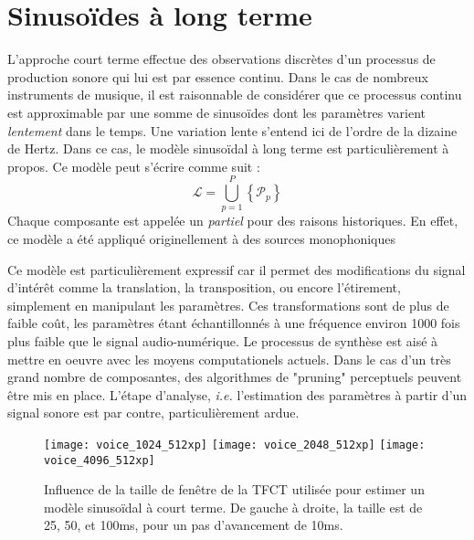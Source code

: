
\section{ \nmu Sinusoïdes à long terme}  \label{sec:slt}

L'approche court terme effectue des observations discrètes d'un processus de production sonore qui lui est par essence continu. Dans le cas de nombreux instruments de musique, il est raisonnable de considérer que ce processus continu est approximable par une somme de sinusoïdes dont les paramètres varient \textsl{lentement} dans le temps. Une variation lente s'entend ici de l'ordre de la dizaine de Hertz. Dans ce cas, le modèle sinusoïdal à long terme est particulièrement à propos. Ce modèle peut s'écrire comme suit :
\begin{equation}
\mathcal{L}=\bigcup_{p=1}^{P}\left\{\mathcal{P}_{p}\right\}
\end{equation}
Chaque composante est appelée un \textsl{partiel} pour des raisons historiques. En effet, ce modèle a été appliqué originellement à des sources monophoniques

Ce modèle est particulièrement expressif car il permet des modifications du signal d'intérêt comme la translation, la transposition, ou encore l'étirement, simplement en manipulant les paramètres. Ces transformations sont de plus de faible coût, les paramètres étant échantillonnés à une fréquence environ 1000 fois plus faible que le signal audio-numérique. Le processus de synthèse est aisé à mettre en oeuvre avec les moyens computationels actuels. Dans le cas d'un très grand nombre de composantes, des algorithmes de "pruning" perceptuels peuvent être mis en place\cite{lagrangeDafx01}.
L'étape d'analyse, \textit{i.e.} l'estimation des paramètres à partir d'un signal sonore est par contre, particulièrement ardue.

\begin{figure*}
  \texttt{[image: voice\_1024\_512xp]}
  \texttt{[image: voice\_2048\_512xp]}
  \texttt{[image: voice\_4096\_512xp]}
  \caption{Influence de la taille de fenêtre de la TFCT utilisée pour estimer un modèle sinusoïdal à court terme. De gauche à droite, la taille est de 25, 50, et 100ms, pour un pas d'avancement de 10ms.}
  \label{fig:ct}
\end{figure*}

